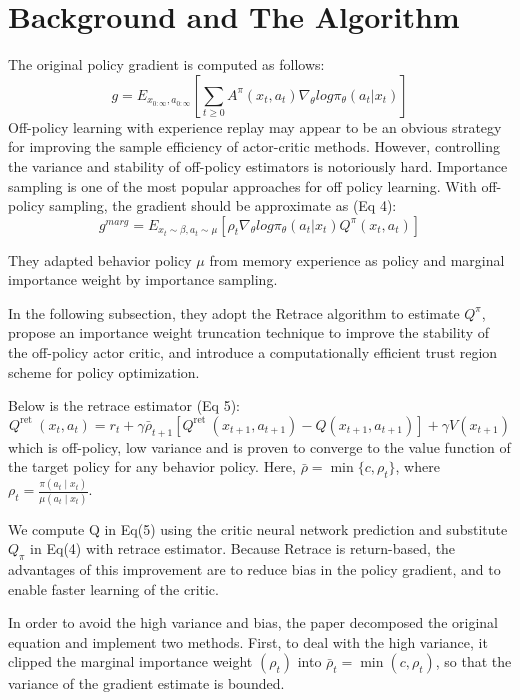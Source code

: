 \section{Background and The Algorithm}
\label{section:algorithm}

The original policy gradient is computed as follows:
$$
	g = E_{x_{0:\infty}, a_{0:\infty}}[\sum_{t \ge 0}A^\pi (x_t, a_t) \nabla_{\theta} log \pi_{\theta}(a_t | x_t)]
$$ 
Off-policy learning with experience replay may appear to be an obvious strategy for improving
the sample efficiency of actor-critic methods. However, controlling the variance and stability of off-policy
estimators is notoriously hard. Importance sampling is one of the most popular approaches for off policy learning.
With off-policy sampling, the gradient should be approximate as (Eq 4):
$$
    g^{marg} = E_{x_t \sim \beta, a_t \sim \mu} [\rho_t \nabla_\theta log \pi_{\theta}(a_t | x_t) Q^\pi (x_t, a_t)]
$$

They adapted behavior policy $\mu$ from memory experience as policy and marginal importance weight by importance sampling.

In the following subsection, 
they adopt the Retrace algorithm to estimate $Q^\pi$, 
propose an importance weight truncation technique to improve the stability of the off-policy actor critic, 
and introduce a computationally efficient trust region scheme for policy optimization.



Below is the retrace estimator (Eq 5): 
$$
Q^{\text {ret }}\left(x_{t}, a_{t}\right)=r_{t}+\gamma \bar{\rho}_{t+1}\left[Q^{\text {ret }}\left(x_{t+1}, a_{t+1}\right)-Q\left(x_{t+1}, a_{t+1}\right)\right]+\gamma V\left(x_{t+1}\right)
$$
which is off-policy, low variance and is proven to converge to the value function of the target policy for any behavior policy.
Here, $\bar{\rho} = \min\{c, \rho_t\}$, where $\rho_{t}= \frac{\pi({a_t}\mid {x_t})} {\mu({a_t}\mid {x_t})}$. 

We compute Q in Eq(5) using the critic neural network prediction and substitute $Q_\pi$ in Eq(4) with retrace estimator. 
Because Retrace is return-based, the advantages of this improvement are to reduce bias in the policy gradient, and to enable faster learning of the critic.




In order to avoid the high variance and bias, the paper decomposed the original equation and implement two methods.
First, to deal with the high variance, it clipped the marginal importance weight $(\rho_t )$ into $ \bar{\rho}_t = \min(c,\rho_t)$, so that the variance of the gradient estimate is bounded. 

